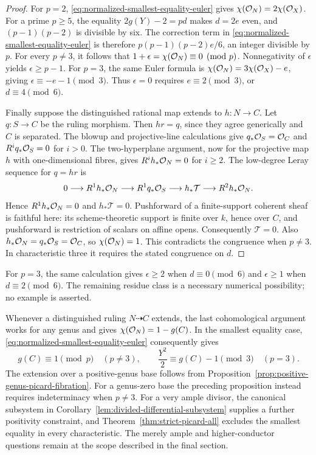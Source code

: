 \begin{proof}
For $p=2$, \eqref{eq:normalized-smallest-equality-euler} gives
$\chi(\mathcal O_N)=2\chi(\mathcal O_X)$.
For a prime $p\geq5$, the equality $2g(Y)-2=pd$ makes $d=2e$
even, and $(p-1)(p-2)$ is divisible by six.
The correction term in
\eqref{eq:normalized-smallest-equality-euler} is therefore
$p(p-1)(p-2)e/6$, an integer divisible by $p$.
For every $p\ne3$, it follows that
$1+\epsilon=\chi(\mathcal O_N)\equiv0\pmod p$.
Nonnegativity of $\epsilon$ yields $\epsilon\geq p-1$.
For $p=3$, the same Euler formula is
$\chi(\mathcal O_N)=3\chi(\mathcal O_X)-e$, giving
$\epsilon\equiv-e-1\pmod3$.
Thus $\epsilon=0$ requires $e\equiv2\pmod3$,
or $d\equiv4\pmod6$.

Finally suppose the distinguished rational map extends to
$h:N\to C$. Let $q:S\to C$ be the ruling morphism.
Then $hr=q$, since they agree generically and $C$ is separated.
The blowup and projective-line calculations give
$q_*\mathcal O_S=\mathcal O_C$ and $R^iq_*\mathcal O_S=0$ for $i>0$.
The two-hyperplane argument, now for the projective map $h$
with one-dimensional fibres, gives $R^ih_*\mathcal O_N=0$ for $i\geq2$.
The low-degree Leray sequence for $q=hr$ is
\[
 0\longrightarrow R^1h_*\mathcal O_N
 \longrightarrow R^1q_*\mathcal O_S
 \longrightarrow h_*\mathcal T
 \longrightarrow R^2h_*\mathcal O_N.
\]
Hence $R^1h_*\mathcal O_N=0$ and $h_*\mathcal T=0$.
Pushforward of a finite-support coherent sheaf is faithful here:
its scheme-theoretic support is finite over $k$, hence over $C$,
and pushforward is restriction of scalars on affine opens.
Consequently $\mathcal T=0$.
Also $h_*\mathcal O_N=q_*\mathcal O_S=\mathcal O_C$, so $\chi(\mathcal O_N)=1$.
This contradicts the congruence when $p\ne3$.
In characteristic three it requires the stated congruence on $d$.
\end{proof}

For $p=3$, the same calculation gives $\epsilon\geq2$ when
$d\equiv0\pmod6$ and $\epsilon\geq1$ when $d\equiv2\pmod6$.
The remaining residue class is a necessary numerical possibility;
no example is asserted.

Whenever a distinguished ruling $N\dashrightarrow C$ extends,
the last cohomological argument works for any genus and gives
$\chi(\mathcal O_N)=1-g(C)$.
In the smallest equality case,
\eqref{eq:normalized-smallest-equality-euler} consequently gives
\[
 g(C)\equiv1\pmod p\quad(p\ne3),\qquad
 \frac{Y^2}{2}\equiv g(C)-1\pmod3\quad(p=3).
\]
The extension over a positive-genus base follows from
Proposition~\ref{prop:positive-genus-picard-fibration}.
For a genus-zero base the preceding proposition instead requires
indeterminacy when $p\ne3$.
For a very ample divisor, the canonical subsystem in
Corollary~\ref{lem:divided-differential-subsystem} supplies a further
positivity constraint, and Theorem~\ref{thm:strict-picard-all}
excludes the smallest equality in every characteristic.
The merely ample and higher-conductor questions remain at the
scope described in the final section.
